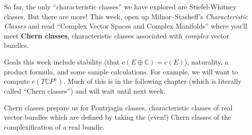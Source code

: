 \documentclass{homework}
\author{Jim Fowler}
\date{Week 10: Chern classes}
\begin{document}
\maketitle

So far, the only ``characteristic classes'' we have explored are
Stiefel-Whitney classes.  But there are more!  This week, open up
Milnor--Stasheff's \textit{Characteristic Classes} and read ``Complex
Vector Spaces and Complex Manifolds'' where you'll meet \textbf{Chern
  classes}, characteristic classes associated with \textit{complex}
vector bundles.

Goals this week include stability (that
$c(E \oplus \mathbb{C}) = c(E)$), naturality, a product formula, and
some sample calculations.  For example, we will want to compute
$c(T\mathbb{C}P^n)$.  Much of this is in the following chapter (which
is literally called ``Chern classes'') and will wait until next week.

Chern classes prepare us for Pontrjagin classes, characteristic
classes of real vector bundles which are defined by taking the (even!)
Chern classes of the complexification of a real bundle.
\end{document}
